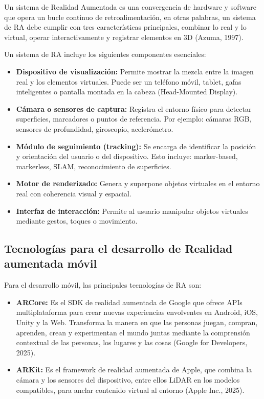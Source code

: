 Un sistema de Realidad Aumentada es una convergencia de hardware y software que
opera un bucle continuo de retroalimentación, en otras palabras, un sistema de
RA debe cumplir con tres características principales, combinar lo real y lo
virtual, operar interactivamente y registrar elementos en 3D (Azuma, 1997).

Un sistema de RA incluye los siguientes componentes esenciales:

\begin{itemize}
    \item \textbf{Dispositivo de visualización:} Permite mostrar la mezcla entre
    la imagen real y los elementos virtuales. Puede ser un teléfono móvil,
    tablet, gafas inteligentes o pantalla montada en la cabeza (Head-Mounted
    Display).
    \item \textbf{Cámara o sensores de captura:} Registra el entorno físico para
    detectar superficies, marcadores o puntos de referencia. Por ejemplo:
    cámaras RGB, sensores de profundidad, giroscopio, acelerómetro.
    \item \textbf{Módulo de seguimiento (tracking):} Se encarga de identificar la
    posición y orientación del usuario o del dispositivo. Esto incluye:
    marker-based, markerless, SLAM, reconocimiento de superficies.
    \item \textbf{Motor de renderizado:} Genera y superpone objetos virtuales en
    el entorno real con coherencia visual y espacial.
    \item \textbf{Interfaz de interacción:} Permite al usuario manipular objetos
    virtuales mediante gestos, toques o movimiento.
\end{itemize}

\subsection{Tecnologías para el desarrollo de Realidad aumentada móvil}

Para el desarrollo móvil, las principales tecnologías de RA son:

\begin{itemize}
    \item \textbf{ARCore:} Es el SDK de realidad aumentada de Google que ofrece
    APIs multiplataforma para crear nuevas experiencias envolventes en Android,
    iOS, Unity y la Web. Transforma la manera en que las personas juegan,
    compran, aprenden, crean y experimentan el mundo juntas mediante la
    comprensión contextual de las personas, los lugares y las cosas
    (Google for Developers, 2025).
    \item \textbf{ARKit:} Es el framework de realidad aumentada de Apple, que
    combina la cámara y los sensores del dispositivo, entre ellos LiDAR en los
    modelos compatibles, para anclar contenido virtual al entorno
    (Apple Inc., 2025). %
\end{itemize}

